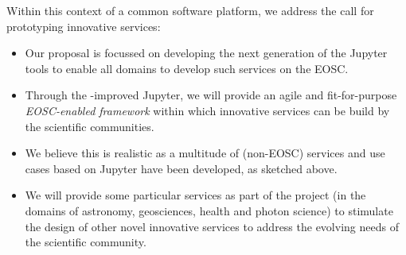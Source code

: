 Within this context of a common software platform, we address the call
for prototyping innovative services:
\begin{itemize}
\item Our \TheProject proposal is focussed on developing the next generation
of the Jupyter tools to enable all domains to develop such services on
the EOSC.

\item Through the \TheProject-improved Jupyter, we will provide an
  agile and fit-for-purpose \emph{EOSC-enabled
framework} within which innovative services can be build by the
scientific communities.

\item We believe this is realistic as a multitude of (non-EOSC) services and
  use cases based on Jupyter have been developed, as sketched above.

\item We will provide some particular services as part of the project
  (in the domains of astronomy, geosciences, health and photon
  science) to stimulate the design of other novel innovative services
  to address the evolving needs of the scientific community.
\end{itemize}
\bigskip


